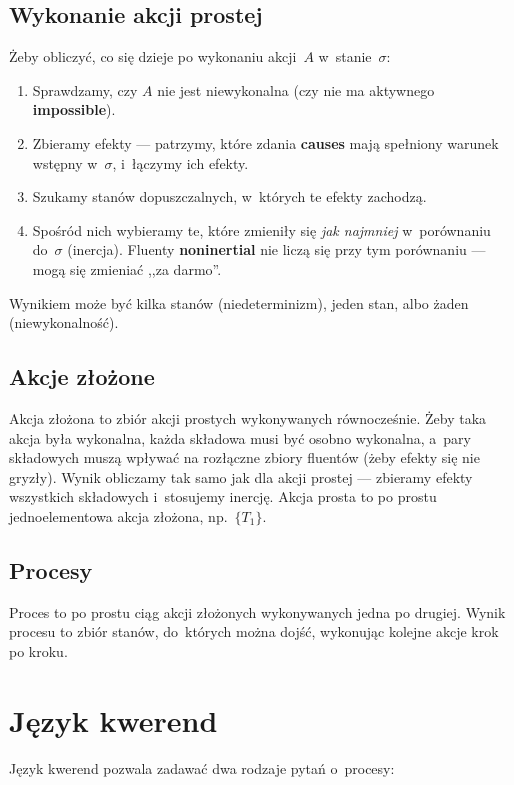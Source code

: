 \documentclass[11pt,a4paper]{article}
\newcommand{\causes}{\textbf{causes}}
\newcommand{\impossible}{\textbf{impossible}}
\newcommand{\noninertial}{\textbf{noninertial}}
\begin{document}
\subsection*{Wykonanie akcji prostej}
Żeby obliczyć, co się dzieje po wykonaniu akcji~$A$ w~stanie~$\sigma$:
\begin{enumerate}
  \item Sprawdzamy, czy $A$ nie jest niewykonalna (czy nie ma aktywnego \impossible{}).
  \item Zbieramy efekty --- patrzymy, które zdania \causes{} mają spełniony warunek
        wstępny w~$\sigma$, i~łączymy ich efekty.
  \item Szukamy stanów dopuszczalnych, w~których te efekty zachodzą.
  \item Spośród nich wybieramy te, które zmieniły się \emph{jak najmniej}
        w~porównaniu do~$\sigma$ (inercja). Fluenty \noninertial{} nie liczą się
        przy tym porównaniu --- mogą się zmieniać ,,za darmo''.
\end{enumerate}
Wynikiem może być kilka stanów (niedeterminizm), jeden stan, albo żaden (niewykonalność).

\subsection*{Akcje złożone}
Akcja złożona to zbiór akcji prostych wykonywanych równocześnie.
Żeby taka akcja była wykonalna, każda składowa musi być osobno wykonalna,
a~pary składowych muszą wpływać na rozłączne zbiory fluentów
(żeby efekty się nie gryzły). Wynik obliczamy tak samo jak dla akcji prostej
--- zbieramy efekty wszystkich składowych i~stosujemy inercję.
Akcja prosta to po prostu jednoelementowa akcja złożona, np.~$\{T_1\}$.

\subsection*{Procesy}
Proces to po prostu ciąg akcji złożonych wykonywanych jedna po drugiej.
Wynik procesu to zbiór stanów, do~których można dojść, wykonując kolejne
akcje krok po kroku.

\section{Język kwerend}

Język kwerend pozwala zadawać dwa rodzaje pytań o~procesy:
\end{document}
